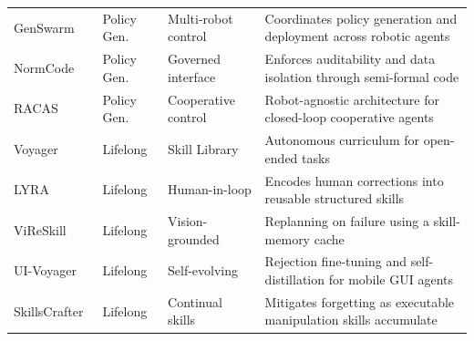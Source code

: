 \begin{table}[t]
\begin{tabularx}{\textwidth}{p{2.7cm}p{1.7cm}p{3.0cm}X}
GenSwarm~\cite{ji2026genswarm} & Policy Gen. & Multi-robot control & Coordinates policy generation and deployment across robotic agents \\
NormCode~\cite{guan2025normcode} & Policy Gen. & Governed interface & Enforces auditability and data isolation through semi-formal code \\
RACAS~\cite{ashley2026racas} & Policy Gen. & Cooperative control & Robot-agnostic architecture for closed-loop cooperative agents \\
Voyager~\cite{wang2023voyager} & Lifelong & Skill Library & Autonomous curriculum for open-ended tasks \\
LYRA~\cite{meng2025growing} & Lifelong & Human-in-loop & Encodes human corrections into reusable structured skills \\
ViReSkill~\cite{kagaya2025vireskill} & Lifelong & Vision-grounded & Replanning on failure using a skill-memory cache \\
UI-Voyager~\cite{lin2026ui} & Lifelong & Self-evolving & Rejection fine-tuning and self-distillation for mobile GUI agents \\
SkillsCrafter~\cite{wang2026lifelong} & Lifelong & Continual skills & Mitigates forgetting as executable manipulation skills accumulate \\
\bottomrule
\end{tabularx}
\label{tab:code_acting_systems}
\end{table}



